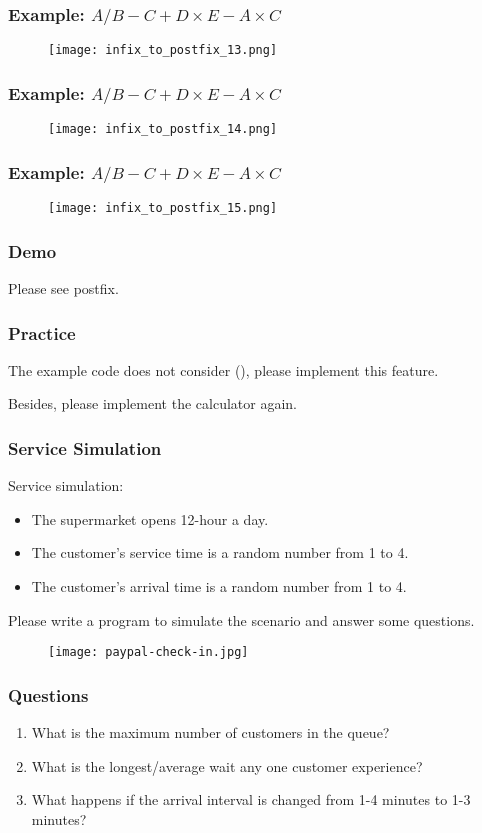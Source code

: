 \documentclass[11pt]{beamer}
\begin{document}
\begin{frame}
\frametitle{Example: $A/B-C+D\times E-A\times C$}
\begin{figure}
\centering
\texttt{[image: infix\_to\_postfix\_13.png]}
\end{figure}
\end{frame}

\begin{frame}
\frametitle{Example: $A/B-C+D\times E-A\times C$}
\begin{figure}
\centering
\texttt{[image: infix\_to\_postfix\_14.png]}
\end{figure}
\end{frame}

\begin{frame}
\frametitle{Example: $A/B-C+D\times E-A\times C$}
\begin{figure}
\centering
\texttt{[image: infix\_to\_postfix\_15.png]}
\end{figure}
\end{frame}

\begin{frame}
\frametitle{Demo}
Please see postfix.
\end{frame}

\begin{frame}
\frametitle{Practice}
The example code does not consider {\color{red} ()}, please implement this feature.

Besides, please implement the calculator again.
\end{frame}

\begin{frame}
\frametitle{Service Simulation}
Service simulation:
\begin{itemize}
\item The supermarket opens 12-hour a day.
\item The customer's service time is a random number from 1 to 4.
\item The customer's arrival time is a random number from 1 to 4.
\end{itemize}
Please write a program to simulate the scenario and answer some questions.
\begin{figure}
\centering
\texttt{[image: paypal-check-in.jpg]}
\end{figure}
\end{frame}

\begin{frame}
\frametitle{Questions}
\begin{enumerate}
\item What is the maximum number of customers in the queue?
\item What is the longest/average wait any one customer experience?
\item What happens if the arrival interval is changed from 1-4 minutes to 1-3 minutes?
\end{enumerate}
\end{frame}
\end{document}
